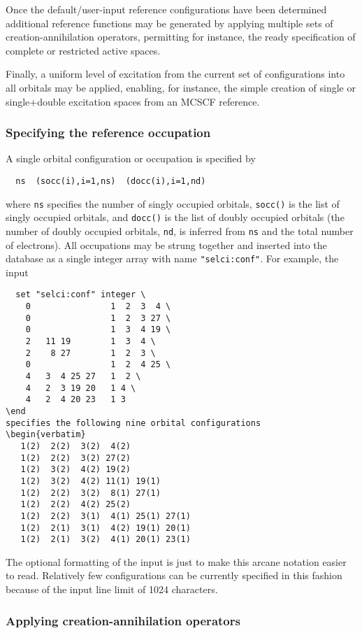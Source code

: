 Once the default/user-input reference configurations have been
determined additional reference functions may be generated by applying
multiple sets of creation-annihilation operators, permitting for
instance, the ready specification of complete or restricted active
spaces.  

Finally, a uniform level of excitation from the current set of
configurations into all orbitals may be applied, enabling, for
instance, the simple creation of single or single+double excitation 
spaces from an MCSCF reference.

\subsubsection{Specifying the reference occupation}

A single orbital configuration or occupation is specified by
\begin{verbatim}
  ns  (socc(i),i=1,ns)  (docc(i),i=1,nd)
\end{verbatim}
where \verb+ns+ specifies the number of singly occupied orbitals,
\verb+socc()+ is the list of singly occupied orbitals, and
\verb+docc()+ is the list of doubly occupied orbitals (the
number of doubly occupied orbitals, \verb+nd+, is inferred from
\verb+ns+ and the total number of electrons).  All occupations may be
strung together and inserted into the database as a single integer
array with name \verb+"selci:conf"+.  For example, the input
\begin{verbatim}
  set "selci:conf" integer \
    0                1  2  3  4 \
    0                1  2  3 27 \
    0                1  3  4 19 \
    2   11 19        1  3  4 \
    2    8 27        1  2  3 \
    0                1  2  4 25 \
    4   3  4 25 27   1  2 \
    4   2  3 19 20   1 4 \
    4   2  4 20 23   1 3  
\end
specifies the following nine orbital configurations
\begin{verbatim}
   1(2)  2(2)  3(2)  4(2)
   1(2)  2(2)  3(2) 27(2)
   1(2)  3(2)  4(2) 19(2)
   1(2)  3(2)  4(2) 11(1) 19(1)
   1(2)  2(2)  3(2)  8(1) 27(1)
   1(2)  2(2)  4(2) 25(2)
   1(2)  2(2)  3(1)  4(1) 25(1) 27(1)
   1(2)  2(1)  3(1)  4(2) 19(1) 20(1)
   1(2)  2(1)  3(2)  4(1) 20(1) 23(1)
\end{verbatim}
The optional formatting of the input is just to make this arcane
notation easier to read.  Relatively few configurations can be
currently specified in this fashion because of the input line limit of
1024 characters.

\subsubsection{Applying creation-annihilation operators}

